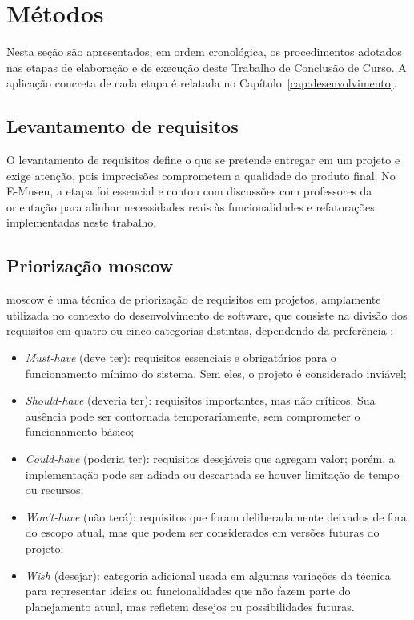 \section{Métodos}\label{sec:metodos}

Nesta seção são apresentados, em ordem cronológica, os procedimentos adotados nas etapas de elaboração e de execução deste Trabalho de Conclusão de Curso. A aplicação concreta de cada etapa é relatada no Capítulo~\ref{cap:desenvolvimento}.


\subsection{Levantamento de requisitos}

O levantamento de requisitos define o que se pretende entregar em um projeto e exige atenção, pois imprecisões comprometem a qualidade do produto final. No E-Museu, a etapa foi essencial e contou com discussões com professores da orientação para alinhar necessidades reais às funcionalidades e refatorações implementadas neste trabalho.


\subsection{Priorização \acrshort{moscow}}

\acrfull{moscow} é uma técnica de priorização de requisitos em projetos, amplamente utilizada no contexto do desenvolvimento de software, que consiste na divisão dos requisitos em quatro ou cinco categorias distintas, dependendo da preferência \cite{moscow}: 

\begin{itemize}
    \item \textit{Must-have} (deve ter): requisitos essenciais e obrigatórios para o funcionamento mínimo do sistema. Sem eles, o projeto é considerado inviável;
    \item \textit{Should-have} (deveria ter): requisitos importantes, mas não críticos. Sua ausência pode ser contornada temporariamente, sem comprometer o funcionamento básico;
    \item \textit{Could-have} (poderia ter): requisitos desejáveis que agregam valor; porém, a implementação pode ser adiada ou descartada se houver limitação de tempo ou recursos;
    \item \textit{Won't-have} (não terá): requisitos que foram deliberadamente deixados de fora do escopo atual, mas que podem ser considerados em versões futuras do projeto;
    \item \textit{Wish} (desejar): categoria adicional usada em algumas variações da técnica para representar ideias ou funcionalidades que não fazem parte do planejamento atual, mas refletem desejos ou possibilidades futuras.
\end{itemize}


